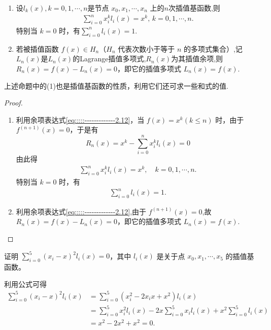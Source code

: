\documentclass[../../main.tex]{subfiles}
\begin{document}
\begin{proposition}\label{proposition:插值基函数和插值余项的性质}
\begin{enumerate}[(1)]
\item 设$l_k(x),k=0,1,\cdots,n$是节点 $x_0, x_1, \cdots, x_n$ 上的$n$次插值基函数,则
\begin{align*}
\sum_{i = 0}^n x_i^k l_i(x) = x^k, \, k = 0, 1, \cdots, n.
\end{align*}
特别当 $k = 0$ 时，有$\sum_{i = 0}^n l_i(x) = 1.$

\item 若被插值函数 $f(x) \in H_n$（$H_n$ 代表次数小于等于 $n$ 的多项式集合）,记$L_n(x)$是$L_n(x)$的Lagrange插值多项式,$R_n(x)$为其插值余项,则 $R_n(x) = f(x) - L_n(x) = 0$，即它的插值多项式 $L_n(x) = f(x)$.
\end{enumerate}
\end{proposition}
\begin{note}
上述命题中的(1)也是插值基函数的性质，利用它们还可求一些和式的值.
\end{note}
\begin{proof}
\begin{enumerate}[(1)]
\item 利用余项表达式\eqref{eq:::::-------------2.12}，当 $f(x) = x^k (k \leqslant n)$ 时，由于 $f^{(n + 1)}(x) = 0$，于是有 
\[
R_n(x) = x^k - \sum_{i = 0}^n x_i^k l_i(x) = 0
\]
由此得 
\begin{align*}
\sum_{i = 0}^n x_i^k l_i(x) = x^k, \quad k = 0, 1, \cdots, n.
\end{align*}
特别当 $k = 0$ 时，有 
\begin{align*}
\sum_{i = 0}^n l_i(x) = 1.
\end{align*}

\item 利用余项表达式\eqref{eq:::::-------------2.12},由于 $f^{(n + 1)}(x) = 0$,故 $R_n(x) = f(x) - L_n(x) = 0$，即它的插值多项式 $L_n(x) = f(x)$.
\end{enumerate}
\end{proof}

\begin{example}
证明 $\sum_{i = 0}^5 (x_i - x)^2 l_i(x) = 0$，其中 $l_i(x)$ 是关于点 $x_0, x_1, \cdots, x_5$ 的插值基函数。
\end{example}
\begin{solution}
利用公式可得 
\begin{align*}
\sum_{i = 0}^5 (x_i - x)^2 l_i(x) &= \sum_{i = 0}^5 (x_i^2 - 2x_i x + x^2) l_i(x) \\
&= \sum_{i = 0}^5 x_i^2 l_i(x) - 2x \sum_{i = 0}^5 x_i l_i(x) + x^2 \sum_{i = 0}^5 l_i(x) \\
&= x^2 - 2x^2 + x^2 = 0.
\end{align*}
\end{solution}
\end{document}
